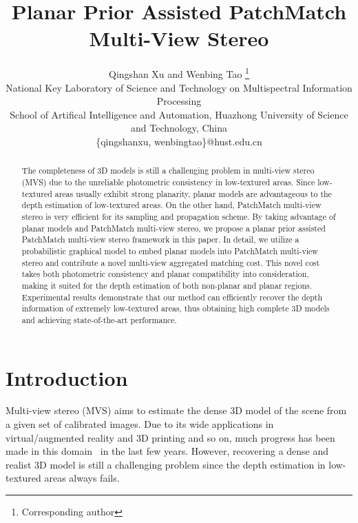 \documentclass[letterpaper]{article} %
\title{Planar Prior Assisted PatchMatch Multi-View Stereo}
\author{Qingshan Xu and Wenbing Tao%
	\thanks{Corresponding author}\\ 
	National Key Laboratory of Science and Technology on Multispectral Information Processing\\ %
	School of Artifical Intelligence and Automation, Huazhong University of Science and Technology, China\\
	\{qingshanxu, wenbingtao\}@hust.edu.cn %
}
\begin{document}
\maketitle

\begin{abstract}
The completeness of 3D models is still a challenging problem in multi-view stereo (MVS) due to the unreliable photometric consistency in low-textured areas. Since low-textured areas usually exhibit strong planarity, planar models are advantageous to the depth estimation of low-textured areas. On the other hand, PatchMatch multi-view stereo is very efficient for its sampling and propagation scheme. By taking advantage of planar models and PatchMatch multi-view stereo, we propose a planar prior assisted PatchMatch multi-view stereo framework in this paper. In detail, we utilize a probabilistic graphical model to embed planar models into PatchMatch multi-view stereo and contribute a novel multi-view aggregated matching cost. This novel cost takes both photometric consistency and planar compatibility into consideration, making it suited for the depth estimation of both non-planar and planar regions. Experimental results demonstrate that our method can efficiently recover the depth information of extremely low-textured areas, thus obtaining high complete 3D models and achieving state-of-the-art performance.       
\end{abstract}

\section{Introduction}

Multi-view stereo (MVS) aims to estimate the dense 3D model of the scene from a given set of calibrated images. Due to its wide applications in virtual/augmented reality and 3D printing and so on, much progress has been made in this domain~\cite{Furukawa2010Accurate,Strecha2006Combined,Merrell2007Real,Goesele2007Multi,Liu2009Continuous,Schonberger2016Pixelwise} in the last few years. However, recovering a dense and realist 3D model is still a challenging problem since the depth estimation in low-textured areas always fails.
\end{document}
